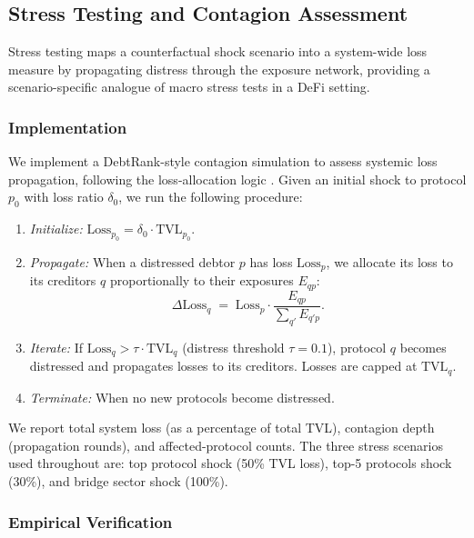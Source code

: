 \subsection{Stress Testing and Contagion Assessment}
\label{subsubsec:contagion}

Stress testing maps a counterfactual shock scenario into a system-wide loss measure by propagating distress through the exposure network, providing a scenario-specific analogue of macro stress tests in a DeFi setting.

\subsubsection{Implementation} 

We implement a DebtRank-style contagion simulation to assess systemic loss propagation, following the loss-allocation logic \cite{EisenbergNoe2001,BattistonEtAl2012DebtRank}. Given an initial shock to protocol $p_0$ with loss ratio $\delta_0$, we run the following procedure:
\begin{enumerate}
  \item \emph{Initialize:} $\text{Loss}_{p_0} = \delta_0 \cdot \text{TVL}_{p_0}$.
  \item \emph{Propagate:} When a distressed debtor $p$ has loss $\text{Loss}_p$, we allocate its loss to its creditors $q$ proportionally to their exposures $E_{qp}$:
  \begin{equation}
    \Delta \text{Loss}_q \;=\; \text{Loss}_p \cdot \frac{E_{qp}}{\sum_{q'} E_{q'p}}.
  \end{equation}
  \item \emph{Iterate:} If $\text{Loss}_q > \tau \cdot \text{TVL}_q$ (distress threshold $\tau=0.1$), protocol $q$ becomes distressed and propagates losses to its creditors. Losses are capped at $\text{TVL}_q$.
  \item \emph{Terminate:} When no new protocols become distressed.
\end{enumerate}
We report total system loss (as a percentage of total TVL), contagion depth (propagation rounds), and affected-protocol counts. The three stress scenarios used throughout are: top protocol shock (50\% TVL loss), top-5 protocols shock (30\%), and bridge sector shock (100\%).

\subsubsection{Empirical Verification}

